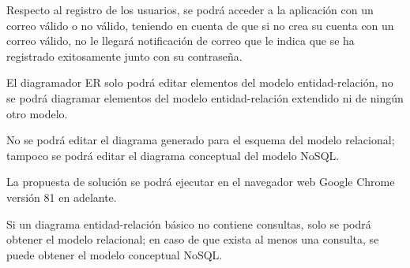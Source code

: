 Respecto al registro de los usuarios, se podrá acceder a la aplicación con un correo válido o no válido, teniendo en cuenta de que si no crea su cuenta con un correo válido, no le llegará notificación de correo que le indica que se ha registrado exitosamente junto con su contraseña.


El diagramador ER solo podrá editar elementos del modelo entidad-relación, no se podrá diagramar elementos del modelo entidad-relación extendido ni de ningún otro modelo.


No se podrá editar el diagrama generado para el esquema del modelo relacional; tampoco se podrá editar el diagrama conceptual del modelo NoSQL.


La propuesta de solución se podrá ejecutar en el navegador web Google Chrome versión 81 en adelante.


Si un diagrama entidad-relación básico no contiene consultas, solo se podrá obtener el modelo relacional; en caso de que exista al menos una consulta, se puede obtener el modelo conceptual NoSQL.
    